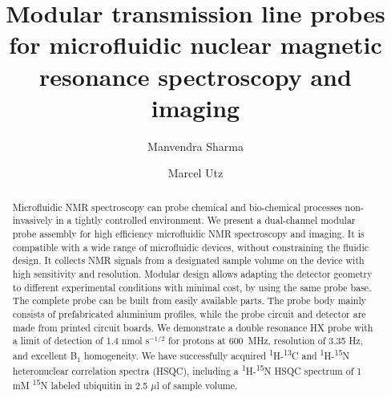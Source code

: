 \documentclass[preprint,5p]{elsarticle}
\begin{document}
\title{Modular transmission line probes for microfluidic nuclear magnetic resonance spectroscopy and imaging}
\author[1]{Manvendra Sharma}
\author[1]{Marcel Utz}
\address[1]{School of Chemistry, University of Southampton, Southampton SO17 1BJ, United Kingdom}
\begin{abstract} Microfluidic NMR spectroscopy can probe chemical and
bio-chemical processes non-invasively in a tightly controlled environment. We
present a dual-channel modular probe assembly for  high efficiency microfluidic
NMR spectroscopy and imaging. It is compatible with a wide range of microfluidic
devices,  without constraining the fluidic design. It collects NMR signals from
a designated sample volume on the device with high sensitivity and resolution.
Modular design allows adapting the detector geometry to different experimental
conditions with minimal cost, by using the same probe base. The complete probe
can be built from easily available parts. The probe body mainly consists of
prefabricated aluminium profiles, while the probe circuit and detector are made
from printed circuit boards. We demonstrate a double resonance HX probe with a
limit of detection of 1.4 nmol s$^{-1/2}$ for protons at 600~MHz, resolution of
3.35 Hz, and excellent B$_{1}$ homogeneity. We have successfully acquired
\textsuperscript{1}H-\textsuperscript{13}C and
\textsuperscript{1}H-\textsuperscript{15}N heteronuclear correlation spectra
(HSQC), including a \textsuperscript{1}H-\textsuperscript{15}N HSQC spectrum of
1 mM \textsuperscript{15}N labeled ubiquitin in 2.5 $\mu$l of sample volume.
\end{abstract} \maketitle
\end{document}

